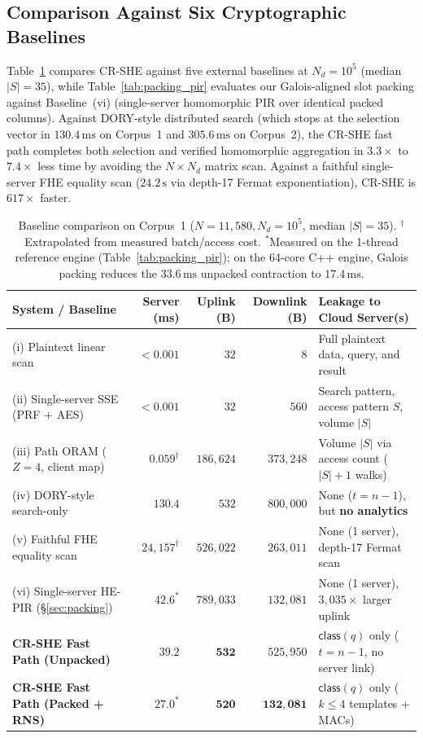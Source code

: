 \documentclass[11pt,a4paper]{article}
\begin{document}
\subsection{Comparison Against Six Cryptographic Baselines}
Table~\ref{tab:baselines} compares CR-SHE against five external baselines at $N_d = 10^5$ (median $|S| = 35$), while Table~\ref{tab:packing_pir} evaluates our Galois-aligned slot packing against Baseline~(vi) (single-server homomorphic PIR over identical packed columns). Against DORY-style distributed search (which stops at the selection vector in $130.4\,\text{ms}$ on Corpus~1 and $305.6\,\text{ms}$ on Corpus~2), the CR-SHE fast path completes both selection and verified homomorphic aggregation in $3.3\times$ to $7.4\times$ less time by avoiding the $N \times N_d$ matrix scan. Against a faithful single-server FHE equality scan ($24.2\,\text{s}$ via depth-17 Fermat exponentiation), CR-SHE is $617\times$ faster.

\begin{table}[t!]
\centering
\small
\renewcommand{\arraystretch}{1.14}
\begin{tabularx}{\textwidth}{lrrrX}
\toprule
\textbf{System / Baseline} & \textbf{Server (ms)} & \textbf{Uplink (B)} & \textbf{Downlink (B)} & \textbf{Leakage to Cloud Server(s)} \\
\midrule
(i) Plaintext linear scan & $< 0.001$ & $32$ & $8$ & Full plaintext data, query, and result \\
(ii) Single-server SSE (PRF + AES) & $< 0.001$ & $32$ & $560$ & Search pattern, access pattern $S$, volume $|S|$ \\
(iii) Path ORAM ($Z=4$, client map) & $0.059^\dagger$ & $186{,}624$ & $373{,}248$ & Volume $|S|$ via access count ($|S|+1$ walks) \\
(iv) DORY-style search-only~\cite{dauterman2020} & $130.4$ & $532$ & $800{,}000$ & None ($t=n-1$), but \textbf{no analytics} \\
(v) Faithful FHE equality scan & $24{,}157^\dagger$ & $526{,}022$ & $263{,}011$ & None (1 server), depth-17 Fermat scan \\
(vi) Single-server HE-PIR (\S\ref{sec:packing}) & $42.6^*$ & $789{,}033$ & $132{,}081$ & None (1 server), $3{,}035\times$ larger uplink \\
\midrule
\textbf{CR-SHE Fast Path (Unpacked)} & $\mathbf{39.2}$ & $\mathbf{532}$ & $525{,}950$ & $\mathsf{class}(q)$ only ($t=n-1$, no server link) \\
\textbf{CR-SHE Fast Path (Packed + RNS)} & $\mathbf{27.0^*}$ & $\mathbf{520}$ & $\mathbf{132{,}081}$ & $\mathsf{class}(q)$ only ($k \le 4$ templates + MACs) \\
\bottomrule
\end{tabularx}
\caption{Baseline comparison on Corpus~1 ($N=11{,}580, N_d=10^5$, median $|S|=35$). $^\dagger$Extrapolated from measured batch/access cost. $^*$Measured on the 1-thread reference engine (Table~\ref{tab:packing_pir}); on the 64-core C++ engine, Galois packing reduces the $33.6\,\text{ms}$ unpacked contraction to $17.4\,\text{ms}$.}
\label{tab:baselines}
\end{table}
\end{document}
